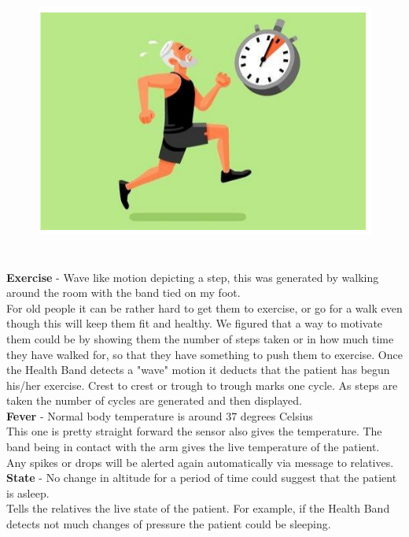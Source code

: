 \begin{figure}[H]
	
	\centering
	\includegraphics[width=\linewidth,height=8cm] {./images/p5.png}

	\label{manual}
\end{figure}\\

\textbf{Exercise} - Wave like motion depicting a step, this was generated by walking around the room with the band tied on my foot.\\
For old people it can be rather hard to get them to exercise, or go for a walk even though this will keep them fit and healthy. We figured that a way to motivate them could be by showing them the number of steps taken or in how much time they have walked for, so that they have something to push them to exercise. Once the Health Band detects a "wave" motion it deducts that the patient has begun his/her exercise. Crest to crest or trough to trough marks one cycle. As steps are taken the number of cycles are generated and then displayed.\\
\textbf{Fever} - Normal body temperature is around 37 degrees Celsius\\
This one is pretty straight forward the sensor also gives the temperature. The band being in contact with the arm gives the live temperature of the patient. Any spikes or drops will be alerted again automatically via message to relatives.\\
\textbf{State} - No change in altitude for a period of time could suggest that the patient is asleep.\\
Tells the relatives the live state of the patient. For example, if the Health Band detects not much changes of pressure the patient could be sleeping.
